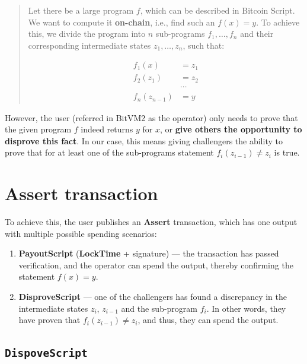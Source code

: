 \documentclass[11pt]{article}
\begin{document}
\begin{quote}
  Let there be a large program \(f\), which can be described in
  Bitcoin Script. We want to compute it \textbf{on-chain}, i.e., find
  such an \(f(x) = y\). To achieve this, we divide the program into
  \(n\) sub-programs \(f_1, \ldots, f_n\) and their corresponding
  intermediate states \(z_1, \ldots, z_n\), such that:

  \begin{equation}
    \begin{aligned}
      f_1(x) &= z_1 \\
      f_2(z_1) &= z_2 \\
      &\cdots \\
      f_n(z_{n-1}) &= y
    \end{aligned}
  \end{equation}
\end{quote}

However, the user (referred in BitVM2 as the operator) only needs to
prove that the given program \(f\) indeed returns \(y\) for \(x\), or
\textbf{give others the opportunity to disprove this fact}. In our
case, this means giving challengers the ability to prove that for at
least one of the sub-programs statement \(f_i(z_{i-1}) \neq z_i\) is
true.

\section{\textbf{Assert} transaction}\label{sec:assert-tx}

To achieve this, the user publishes an \textbf{Assert} transaction,
which has one output with multiple possible spending scenarios:

\begin{enumerate}
  \item \textbf{PayoutScript} (\textbf{LockTime} + signature) --- the
    transaction has passed verification, and the operator can spend the
    output, thereby confirming the statement \(f(x) = y\).
  \item \textbf{DisproveScript} --- one of the challengers has found a
    discrepancy in the intermediate states \(z_i\), \(z_{i-1}\) and the
    sub-program \(f_i\). In other words, they have proven that
    \(f_i(z_{i-1}) \neq z_i\), and thus, they can spend the output.
\end{enumerate}

\subsection{\texttt{DispoveScript}}\label{sec:dispove-script}
\end{document}
